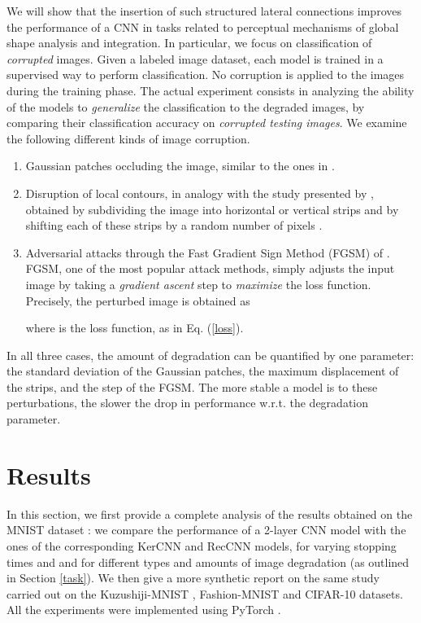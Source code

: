 \documentclass[11pt,oneside,reqno]{amsart}
\begin{document}
 We will show that the insertion of such structured lateral connections improves the performance of a CNN in tasks related to perceptual mechanisms of global shape analysis and integration. In particular, we focus on classification of \emph{corrupted} images. Given a labeled image dataset, each model is trained in a supervised way to perform classification. No corruption is applied to the images during the training phase. The actual experiment consists in analyzing the ability of the models to \emph{generalize} the classification to the degraded images, by comparing their classification accuracy on \emph{corrupted testing images}. We examine the following different kinds of image corruption.
 \begin{enumerate}
  \item Gaussian patches occluding the image, similar to the ones in \citet{tang}.
  \item Disruption of local contours, in analogy with the study presented by \citet{baker}, obtained by subdividing the image into horizontal or vertical strips and by shifting each of these strips by a random number of pixels .
  \item Adversarial attacks through the Fast Gradient Sign Method (FGSM) of \citet{fgsm}. FGSM, one of the most popular attack methods, simply adjusts the input image by taking a \emph{gradient ascent} step to \emph{maximize} the loss function. Precisely, the perturbed image  is obtained as
 
 where  is the loss function, as in Eq. (\ref{loss}).
 \end{enumerate}
 In all three cases, the amount of degradation can be quantified by one parameter: the standard deviation of the Gaussian patches, the maximum displacement  of the strips, and the step  of the FGSM. The more stable a model is to these perturbations, the slower the drop in performance w.r.t. the degradation parameter.

 
 \section{Results}\label{results}
 In this section, we first provide a complete analysis of the results obtained on the MNIST dataset \citep{mnist}: we compare the performance of a 2-layer CNN model with the ones of the corresponding KerCNN and RecCNN models, for varying stopping times  and  and for different types and amounts of image degradation (as outlined in Section \ref{task}). We then give a more synthetic report on the same study carried out on the Kuzushiji-MNIST \citep{kmnist}, Fashion-MNIST \citep{fashion} and CIFAR-10 \citep{cifar} datasets. All the experiments were implemented using PyTorch \citep{pytorch}.
\end{document}
